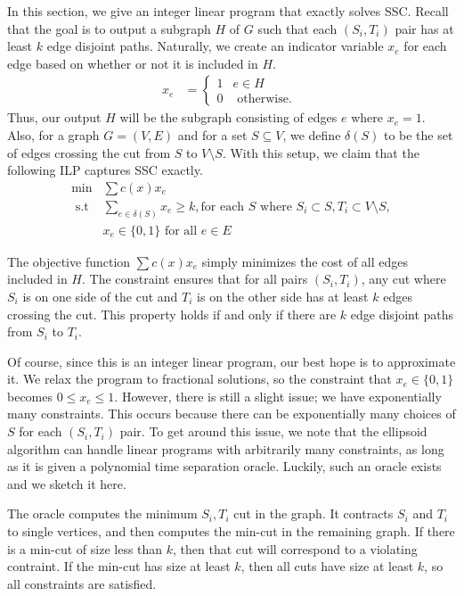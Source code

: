 \documentclass[12pt]{article}
\begin{document}
In this section, we give an integer linear program that exactly solves SSC. Recall that the goal is to output a subgraph $H$ of $G$ such that each $(S_i,T_i)$ pair has at least $k$ edge disjoint paths. Naturally, we create an indicator variable $x_e$ for each edge based on whether or not it is included in $H$. 
\begin{align}
 x_e &= \left\{ \begin{array}{cc} 1 & e \in H \\
                                  0 & \text{ otherwise. } \end{array} \right.
\end{align}
Thus, our output $H$ will be the subgraph consisting of edges $e$ where $x_e = 1$. Also, for a graph $G = (V,E)$ and for a set $S \subseteq V$, we define $\delta(S)$ to be the set of edges crossing the cut from $S$ to $V \setminus S$. 
With this setup, we claim that the following ILP captures SSC exactly. 
\begin{align}
\min & \sum c(x) x_e  \\
\text{ s.t } & \sum_{e \in \delta(S)} x_e \geq k, \text{for each }S\text{ where } S_i \subset S,T_i \subset V \setminus S,  \\
& x_e \in \{0,1\} \text{ for all }e \in E
\end{align}

The objective function $\sum c(x) x_e$ simply minimizes the cost of all edges included in $H$. The constraint ensures that for all pairs $(S_i,T_i)$, any cut where $S_i$ is on one side of the cut and $T_i$ is on the other side has at least $k$ edges crossing the cut. This property holds if and only if there are $k$ edge disjoint paths from $S_i$ to $T_i$. 

Of course, since this is an integer linear program, our best hope is to approximate it. We relax the program to fractional solutions, so the constraint that $x_e \in \{0,1\}$ becomes $0 \leq x_e \leq 1$. However, there is still a slight issue; we have exponentially many constraints. This occurs because there can be exponentially many choices of $S$ for each $(S_i,T_i)$ pair. To get around this issue, we note that the ellipsoid algorithm can handle linear programs with arbitrarily many constraints, as long as it is given a polynomial time separation oracle. Luckily, such an oracle exists and we sketch it here.

The oracle computes the minimum $S_i, T_i$ cut in the graph. It contracts $S_i$ and $T_i$ to single vertices, and then computes the min-cut in the remaining graph. If there is a min-cut of size less than $k$, then that cut will correspond to a violating contraint. If the min-cut has size at least $k$, then all cuts have size at least $k$, so all constraints are satisfied.
\end{document}
